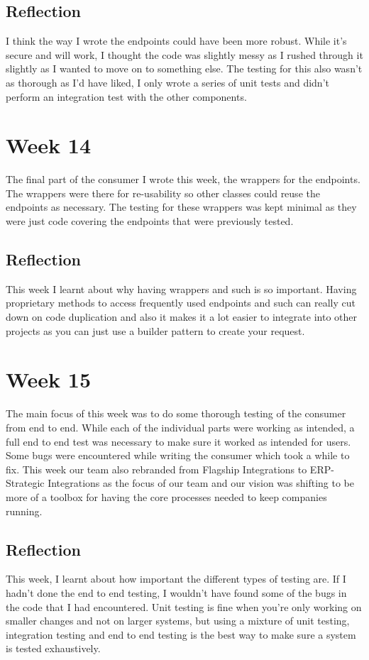 \subsection{Reflection}
I think the way I wrote the endpoints could have been more robust. While it's secure and will work, I thought the code was slightly messy as I rushed through it slightly as I wanted to move on to something else. The testing for this also wasn't as thorough as I'd have liked, I only wrote a series of unit tests and didn't perform an integration test with the other components. 

\section{Week 14}
The final part of the consumer I wrote this week, the wrappers for the endpoints. The wrappers were there for re-usability so other classes could reuse the endpoints as necessary. The testing for these wrappers was kept minimal as they were just code covering the endpoints that were previously tested. 

\subsection{Reflection}
This week I learnt about why having wrappers and such is so important. Having proprietary methods to access frequently used endpoints and such can really cut down on code duplication and also it makes it a lot easier to integrate into other projects as you can just use a builder pattern to create your request. 

\section{Week 15}
The main focus of this week was to do some thorough testing of the consumer from end to end. While each of the individual parts were working as intended, a full end to end test was necessary to make sure it worked as intended for users. Some bugs were encountered while writing the consumer which took a while to fix. \newline This week our team also rebranded from Flagship Integrations to ERP-Strategic Integrations as the focus of our team and our vision was shifting to be more of a toolbox for having the core processes needed to keep companies running. 

\subsection{Reflection}
This week, I learnt about how important the different types of testing are. If I hadn't done the end to end testing, I wouldn't have found some of the bugs in the code that I had encountered. Unit testing is fine when you're only working on smaller changes and not on larger systems, but using a mixture of unit testing, integration testing and end to end testing is the best way to make sure a system is tested exhaustively. 

